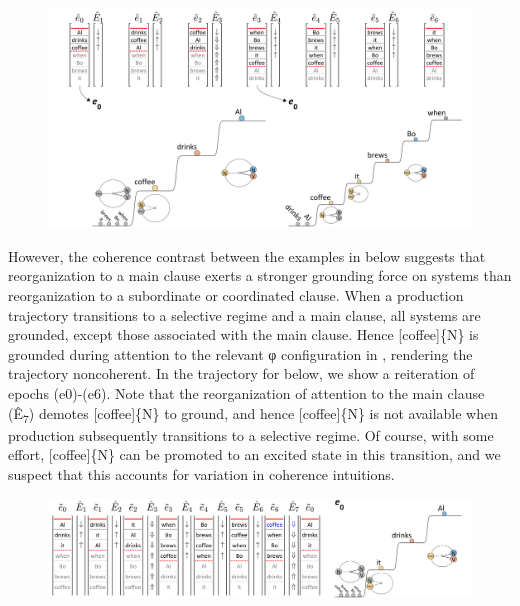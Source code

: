 \begin{figure}
\includegraphics[width=\textwidth]{figures/Tilsen-img154.png}
\caption{\missingcaption}
\label{fig:}
\end{figure}
 

  However, the coherence contrast between the examples in  below suggests that reorganization to a main clause exerts a stronger grounding force on systems than reorganization to a subordinate or coordinated clause. When a production trajectory transitions to a selective regime and a main clause, all systems are grounded, except those associated with the main clause. Hence [coffee]\{N\} is grounded during attention to the relevant φ configuration in , rendering the trajectory noncoherent. In the trajectory for  below, we show a reiteration of epochs (e0)-(e6). Note that the reorganization of attention to the main clause (Ê\textsubscript{7}) demotes [coffee]\{N\} to ground, and hence [coffee]\{N\} is not available when production subsequently transitions to a selective regime. Of course, with some effort, [coffee]\{N\} can be promoted to an excited state in this transition, and we suspect that this accounts for variation in coherence intuitions. 

\ea
\z
\z
  
\begin{figure}
\includegraphics[width=\textwidth]{figures/Tilsen-img155.png}
\caption{\missingcaption}
\label{fig:}
\end{figure}
 

